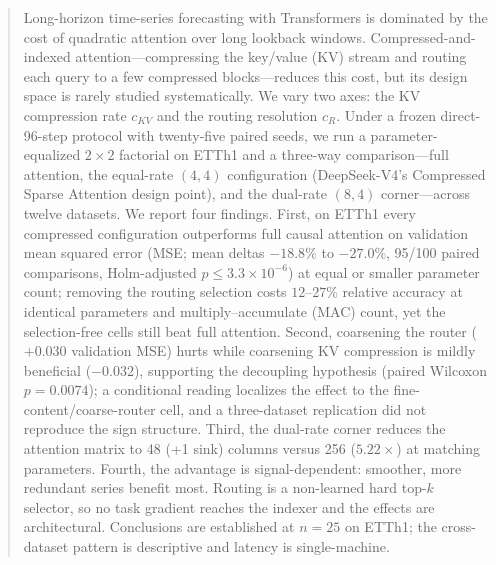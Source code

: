 \begin{abstract}
Long-horizon time-series forecasting with Transformers is dominated by the
cost of quadratic attention over long lookback windows. Compressed-and-indexed
attention---compressing the key/value (KV) stream and routing each query to a
few compressed blocks---reduces this cost, but its design space is rarely
studied systematically. We vary two axes: the KV compression rate $c_{KV}$ and
the routing resolution $c_R$. Under a frozen direct-96-step protocol with
twenty-five paired seeds, we run a parameter-equalized $2\times2$ factorial on
ETTh1 and a three-way comparison---full attention, the equal-rate $(4,4)$
configuration (DeepSeek-V4's Compressed Sparse Attention design point), and the
dual-rate $(8,4)$ corner---across twelve datasets. We report four findings.
First, on ETTh1 every compressed configuration outperforms full causal
attention on validation mean squared error (MSE; mean deltas $-18.8\%$ to
$-27.0\%$, 95/100 paired comparisons, Holm-adjusted $p \le 3.3\times10^{-6}$)
at equal or smaller parameter count; removing the routing selection costs
$12$--$27\%$ relative accuracy at identical parameters and multiply--accumulate
(MAC) count, yet the selection-free cells still beat full attention. Second,
coarsening the router ($+0.030$ validation MSE) hurts while coarsening KV
compression is mildly beneficial ($-0.032$), supporting the decoupling
hypothesis (paired Wilcoxon $p = 0.0074$); a conditional reading localizes the
effect to the fine-content/coarse-router cell, and a three-dataset
replication did not reproduce the sign structure. Third, the dual-rate corner
reduces the attention matrix to 48 (+1 sink) columns versus 256
($5.22\times$) at matching parameters. Fourth, the advantage is signal-dependent:
smoother, more redundant series benefit most. Routing is a non-learned hard
top-$k$ selector, so no task gradient reaches the indexer and the effects are
architectural. Conclusions are established at $n{=}25$ on ETTh1; the
cross-dataset pattern is descriptive and latency is single-machine.
\end{abstract}
